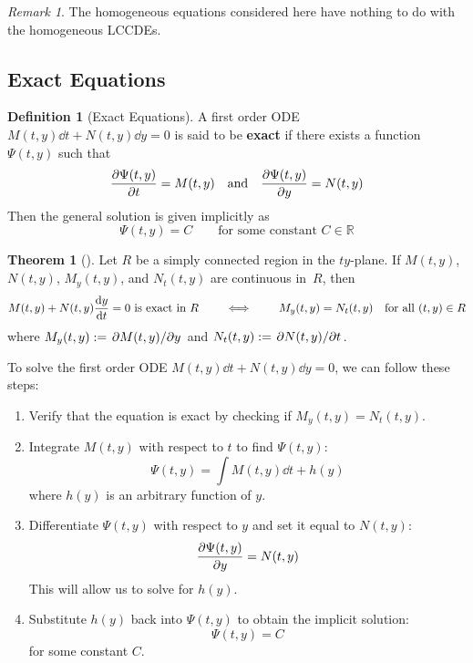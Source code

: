 \documentclass[10pt,UTF8]{article}
\newenvironment{definitionBox}
{
  \begin{tcolorbox}[colback=blue!5!white,colframe=blue!75!black,parbox=false,before
  upper=\par,before lower=\par]}
  {
\end{tcolorbox}}
\newenvironment{theoremBox}
{
  \begin{tcolorbox}[colback=yellow!5!white,colframe=yellow!75!black,parbox=false,before
  upper=\par,before lower=\par]}
  {
\end{tcolorbox}}
\theoremstyle{definition}
\newtheorem{definition inner}{Definition}[section]
\newenvironment{definition}[1][]
{
  \begin{definitionBox}
  \begin{definition inner}[#1]\hfill\par}
    {
    \end{definition inner}
\end{definitionBox}}
\theoremstyle{definition}
\newtheorem{theorem inner}{Theorem}[section]
\newenvironment{theorem}[1][]
{
  \begin{theoremBox}
  \begin{theorem inner}[#1]\hfill\par}
    {
    \end{theorem inner}
\end{theoremBox}}
\theoremstyle{definition}
\newtheorem*{proof inner}{\textit{Proof}}
\theoremstyle{plain}
\newtheorem{tip inner}{Tip}[section]
\theoremstyle{remark}
\newtheorem*{remark}{\textit{Remark}}
\begin{document}
\begin{remark}
  The homogeneous equations considered here have nothing to do with
  the homogeneous LCCDEs.
\end{remark}

\subsection{Exact Equations}

\begin{definition}[Exact Equations]
  A first order ODE \(M(t,y)\dd{t}+N(t,y)\dd{y}=0\) is said to be
  \textbf{exact} if there exists a function \(\Psi(t,y)\) such that
  \begin{equation*}
    \pdv{\Psi(t,y)}{t} = M(t,y) \qand \pdv{\Psi(t,y)}{y} = N(t,y)
  \end{equation*}
  Then the general solution is given implicitly as
  \[
    \Psi(t,y) = C \qquad\text{for some constant } C \in \mathbb{R}
  \]
\end{definition}

\begin{theorem}
  Let \(R\) be a simply connected region in the \(t y\)-plane.
  If \(M(t,y)\), \(N(t,y)\), \(M_y(t,y)\), and \(N_t(t,y)\) are
  continuous in~\(R\), then
  \begin{equation*}
    M(t,y) + N(t,y) \dv{y}{t} = 0 \text{ is exact in } R
    \qquad\iff\qquad
    M_y(t,y) = N_t(t,y) \quad \text{for all } (t,y) \in R
  \end{equation*}
  where \(M_y(t,y) := \pdv*{M(t,y)}{y}\) and \(N_t(t,y) := \pdv*{N(t,y)}{t}\).
\end{theorem}

To solve the first order ODE \(M(t,y)\dd{t}+N(t,y)\dd{y}=0\),
we can follow these steps:
\begin{enumerate}
  \item Verify that the equation is exact by checking if \(M_y(t,y) =
    N_t(t,y)\).
  \item Integrate \(M(t,y)\) with respect to \(t\) to find \(\Psi(t,y)\):
    \[
      \Psi(t,y) = \int M(t,y)\dd{t} + h(y)
    \]
    where \(h(y)\) is an arbitrary function of \(y\).
  \item Differentiate \(\Psi(t,y)\) with respect to \(y\) and set it
    equal to \(N(t,y)\):
    \[
      \pdv{\Psi(t,y)}{y} = N(t,y)
    \]
    This will allow us to solve for \(h(y)\).
  \item Substitute \(h(y)\) back into \(\Psi(t,y)\) to obtain the
    implicit solution:
    \[
      \Psi(t,y) = C
    \]
    for some constant \(C\).
\end{enumerate}
\end{document}
